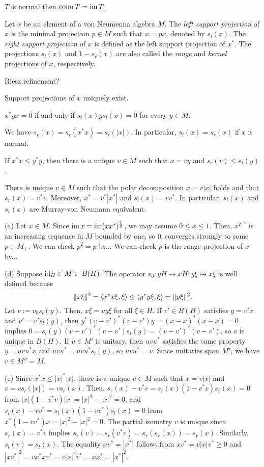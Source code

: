 \documentclass{../../large}
\begin{document}
$T$ is normal then $\operatorname{coim} T=\operatorname{im} T$.

\begin{prb}
Let $x$ be an element of a von Neumenna algebra $M$.
The \emph{left support projection} of $x$ is the minimal projection $p\in M$ such that $x=px$, denoted by $s_l(x)$.
The \emph{right support projection} of $x$ is defined as the left support projection of $x^*$.
The projections $s_l(x)$ and $1-s_r(x)$ are also called the \emph{range} and \emph{kernel} projections of $x$, respectively.

Riesz refinement?
\begin{parts}
\item Support projections of $x$ uniquely exist.
\item $x^*yx=0$ if and only if $s_l(x)ys_l(x)=0$ for every $y\in M$.
\item We have $s_r(x)=s_r(x^*x)=s_r(|x|)$. In particular, $s_l(x)=s_r(x)$ if $x$ is normal.
\item If $x^*x\le y^*y$, then there is a unique $v\in M$ such that $x=vy$ and $s_r(v)\le s_l(y)$.
\item There is unique $v\in M$ such that the polar decomposition $x=v|x|$ holds and that $s_r(x)=v^*v$. Moreover, $x^*=v^*|x^*|$ and $s_l(x)=vv^*$. In particular, $s_l(x)$ and $s_r(x)$ are Murray-von Neumann equivalent.
\end{parts}
\end{prb}
\begin{pf}
(a)
Let $x\in M$.
Since $\operatorname{im} x=\operatorname{im}(xx^*)^{\frac12}$, we may assume $0\le x\le1$.
Then, $x^{2^{-n}}$ is an increasing sequence in $M$ bounded by one, so it converges strongly to some $p\in M_+$.
We can check $p^2=p$ by...
We can check $p$ is the range projection of $x$ by...

(d)
Suppose $\operatorname{id}_H\in M\subset B(H)$.
The operator $v_0:\bar{yH}\to\bar{xH}:y\xi\mapsto x\xi$ is well defined because
\[\|x\xi\|^2=\langle x^*x\xi,\xi\rangle\le\langle y^*y\xi,\xi\rangle=\|y\xi\|^2.\]
Let $v:=v_0s_l(y)$.
Then, $x\xi=vy\xi$ for all $\xi\in H$.
If $v'\in B(H)$ satisfies $y=v'x$ and $v'=v's_l(y)$, then $y^*(v-v')^*(v-v')y=(x-x)^*(x-x)=0$ implies $0=s_l(y)(v-v')^*(v-v')s_l(y)=(v-v')^*(v-v')$, so $v$ is unique in $B(H)$.
If $u\in M'$ is unitary, then $uvu^*$ satisfies the same property $y=uvu^*x$ and $uvu^*=uvu^*s_l(y)$, so $uvu^*=v$.
Since unitaries span $M'$, we have $v\in M''=M$.

(e)
Since $x^*x\le|x|^*|x|$, there is a unique $v\in M$ such that $x=v|x|$ and $v=vs_l(|x|)=vs_r(x)$.
Then, $s_r(x)-v^*v=s_r(x)(1-v^*v)s_r(x)=0$ from $|x|(1-v^*v)|x|=|x|^2-|x|^2=0$, and $s_l(x)-vv^*=s_l(x)(1-vv^*)s_l(x)=0$ from $x^*(1-vv^*)x=|x|^2-|x|^2=0$.
The partial isometry $v$ is unique since $s_r(x)=v^*v$ implies $s_r(v)=s_r(v^*v)=s_r(s_r(x))=s_r(x)$.
Similarly, $s_l(v)=s_l(x)$.
The equality $xv^*=|x^*|$ follows from $xv^*=v|x|v^*\ge0$ and $|xv^*|^2=vx^*xv^*=v|x|^2v^*=xx^*=|x^*|^2$.
\end{pf}
\end{document}
